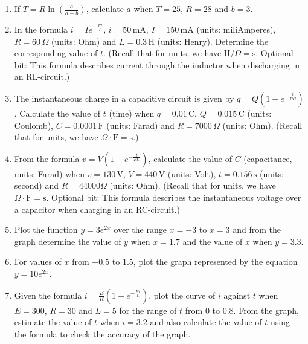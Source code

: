 \documentclass[
  english,
  12pt,
  oneside]{book}
\providecommand{\tightlist}{%
  \setlength{\itemsep}{0pt}\setlength{\parskip}{0pt}}
\theoremstyle{definition}
\theoremstyle{definition}
\theoremstyle{definition}
\theoremstyle{definition}
\theoremstyle{remark}
\begin{document}
\begin{enumerate}
  \begin{enumerate}
  \def\labelenumii{\roman{enumii})}
  \tightlist
  \item
    \(25=e^x\)
  \item
    \(34=3e^x\)
  \item
    \(268=e^{1.4x}\)
  \item
    \(94.2=e^{-3.2x}\)
  \item
    \(0.72=e^{-0.08x}\)
  \end{enumerate}
\item
  If \(T=R\ln\left(\frac{a}{a-b}\right)\), calculate \(a\) when \(T=25\), \(R=28\) and \(b=3\).
\item
  In the formula \(i=Ie^{-\frac{Rt}{L}}\), \(i=50\,\mathrm{mA}\), \(I=150\,\mathrm{mA}\) (units: miliAmperes), \(R=60\,\Omega\) (units: Ohm) and \(L=0.3\,\mathrm{H}\) (units: Henry). Determine the corresponding value of \(t\). (Recall that for units, we have \(\mathrm{H}/\Omega = \mathrm{s}\). Optional bit: This formula describes current through the inductor when discharging in an RL-circuit.)
\item
  The instantaneous charge in a capacitive circuit is given by \(q=Q\left(1-e^{-\frac{t}{RC}}\right)\). Calculate the value of \(t\) (time) when \(q=0.01\,\mathrm{C}\), \(Q=0.015\,\mathrm{C}\) (units: Coulomb), \(C=0.0001\,\mathrm{F}\) (units: Farad) and \(R=7000\,\Omega\) (units: Ohm). (Recall that for units, we have \(\Omega\cdot\mathrm{F}=\mathrm{s}\).)
\item
  From the formula \(v=V\left(1-e^{-\frac{t}{RC}}\right)\), calculate the value of \(C\) (capacitance, units: Farad) when \(v=130\,\mathrm{V}\), \(V=440\,\mathrm{V}\) (units: Volt), \(t=0.156\,\mathrm{s}\) (units: second) and \(R=44000\Omega\) (units: Ohm). (Recall that for units, we have \(\Omega\cdot\mathrm{F}=\mathrm{s}\). Optional bit: This formula describes the instantaneous voltage over a capacitor when charging in an RC-circuit.)
\item
  Plot the function \(y = 3e^{2x}\) over the range \(x = -3\) to \(x = 3\) and from the graph determine the value
  of \(y\) when \(x = 1.7\) and the value of \(x\) when \(y = 3.3\).
\item
  For values of \(x\) from \(-0.5\) to \(1.5\), plot the graph represented by the equation \(y = 10e^{2x}\).
\item
  Given the formula \(i=\frac{E}{R}\left(1-e^{-\frac{Rt}{L}}\right)\), plot the curve of \(i\) against \(t\) when \(E=300\), \(R=30\) and \(L=5\) for the range of \(t\) from \(0\) to \(0.8\). From the graph, estimate the value of \(t\) when \(i=3.2\) and also calculate the value of \(t\) using the formula to check the accuracy of the graph.

\end{enumerate}
\end{document}
